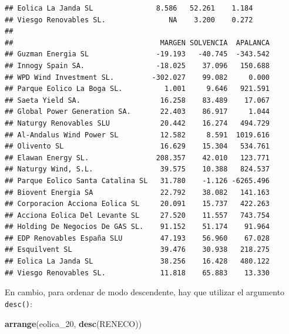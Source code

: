 \documentclass[
]{book}
\newenvironment{Shaded}{\begin{snugshade}}{\end{snugshade}}
\newcommand{\FunctionTok}[1]{\textcolor[rgb]{0.13,0.29,0.53}{\textbf{#1}}}
\newcommand{\NormalTok}[1]{#1}
\begin{document}
\begin{verbatim}
## Eolica La Janda SL               8.586   52.261    1.184
## Viesgo Renovables SL.               NA    3.200    0.272
## 
##                                   MARGEN SOLVENCIA  APALANCA
## Guzman Energia SL                -19.193   -40.745  -343.542
## Innogy Spain SA.                 -18.025    37.096   150.688
## WPD Wind Investment SL.         -302.027    99.082     0.000
## Parque Eolico La Boga SL.          1.001     9.646   921.591
## Saeta Yield SA.                   16.258    83.489    17.067
## Global Power Generation SA.       22.403    86.917     1.044
## Naturgy Renovables SLU            20.442    16.274   494.729
## Al-Andalus Wind Power SL          12.582     8.591  1019.616
## Olivento SL                       16.629    15.304   534.761
## Elawan Energy SL.                208.357    42.010   123.771
## Naturgy Wind, S.L.                39.575    10.388   824.537
## Parque Eolico Santa Catalina SL   31.780    -1.126 -6265.496
## Biovent Energia SA                22.792    38.082   141.163
## Corporacion Acciona Eolica SL     20.091    15.737   422.263
## Acciona Eolica Del Levante SL     27.520    11.557   743.754
## Holding De Negocios De GAS SL.    91.152    51.174    91.964
## EDP Renovables España SLU         47.193    56.960    67.028
## Esquilvent SL                     39.476    30.938   218.275
## Eolica La Janda SL                38.256    16.428   480.122
## Viesgo Renovables SL.             11.818    65.883    13.330
\end{verbatim}

En cambio, para ordenar de modo descendente, hay que utilizar el argumento \texttt{desc()}:

\begin{Shaded}
\begin{Highlighting}[]
\FunctionTok{arrange}\NormalTok{(eolica\_20, }\FunctionTok{desc}\NormalTok{(RENECO))}
\end{Highlighting}
\end{Shaded}
\end{document}
